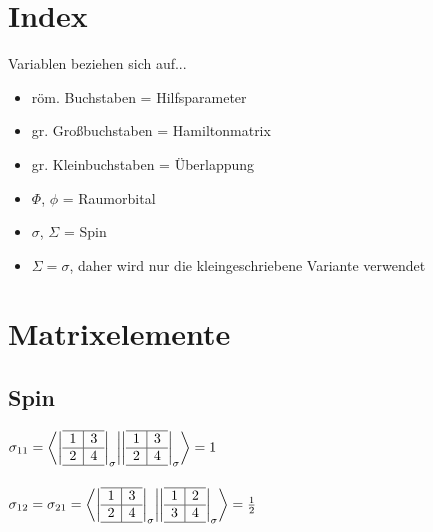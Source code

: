 \documentclass[12pt,a4paper]{article}
\begin{document}
\tableofcontents

\section*{Index}
Variablen beziehen sich auf...
\begin{itemize}
\item röm. Buchstaben = Hilfsparameter
\item gr. Großbuchstaben = Hamiltonmatrix
\item gr. Kleinbuchstaben = Überlappung
\item $\Phi$, $\phi$ = Raumorbital
\item $\sigma$, $\Sigma$ = Spin
\item $\Sigma = \sigma$, daher wird nur die kleingeschriebene Variante verwendet
\end{itemize}
\newpage 


\section{Matrixelemente}

\subsection{Spin}

$\sigma_{11} = \bra{\left|
  \begin{array}{c|c}
  \hline 
    1 & 3 \\ \hline 
    2 & 4 \\
    \hline 
  \end{array}
\right|_\sigma} \ket{\left|
  \begin{array}{c|c}
  \hline 
    1 & 3 \\ \hline 
    2 & 4 \\
    \hline 
  \end{array}
\right|_\sigma} = 1$ \\ \\

$\sigma_{12} = \sigma_{21} = \bra{\left|
  \begin{array}{c|c}
  \hline 
    1 & 3 \\ \hline 
    2 & 4 \\
    \hline 
  \end{array}
\right|_\sigma }  \ket{\left|
  \begin{array}{c|c}
  \hline 
    1 & 2 \\ \hline 
    3 & 4 \\
    \hline 
  \end{array}
 \right|_\sigma} = \frac{1}{2}$ \\ \\ 
\end{document}
